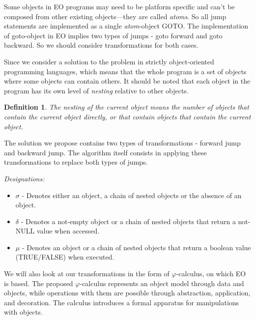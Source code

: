 \documentclass[sigplan,review,11pt,nonacm,natbib=false]{acmart}
\newtheorem{definition}{Definition}[section]
\begin{document}
Some objects in EO programs may need to be platform specific and can’t be composed from other existing objects—they are called \emph{atoms}. 
So all jump statements are implemented as a
single \emph{atom}-object GOTO. The implementation of goto-object in EO implies two types of jumps - goto forward and goto backward. So we should consider transformations for both cases.

Since we consider a solution to the problem in strictly object-oriented programming languages, which means that the whole program is a set of objects where some objects can contain others.
It should be noted that each object in the program has its own level of \emph{nesting} relative to other objects.

\begin{definition} The \emph{nesting} of the current object means the number of objects that contain the current object directly, or that contain objects that contain the current object.
\end{definition}

The solution we propose contains two types of transformations - forward jump and backward jump.
The algorithm itself consists in applying these transformations to replace both types of jumps.

\vspace{5mm}

\emph{Designations:}

\begin{itemize}
\item $\sigma$ - Denotes either an object, a chain of nested objects or the absence of an object.

\item $\delta$ - Denotes a not-empty object or a chain of nested objects that return a not-NULL value when accessed.

\item $\mu$ - Denotes an object or a chain of nested objects that return a boolean value (TRUE/FALSE) when executed.
\end{itemize}

\newcommand\sgm[1]{$\sigma_#1$}
\newcommand\dlt[1]{$\delta_#1$}
\newcommand\m[1]{$\mu_#1$}

We will also look at our transformations in the form of $\varphi$-calculus, on which EO is based. The proposed $\varphi$-calculus represents an object model through data and objects, while operations with them are possible through abstraction, application, and decoration.
The calculus introduces a formal apparatus for manipulations with objects.
\end{document}
